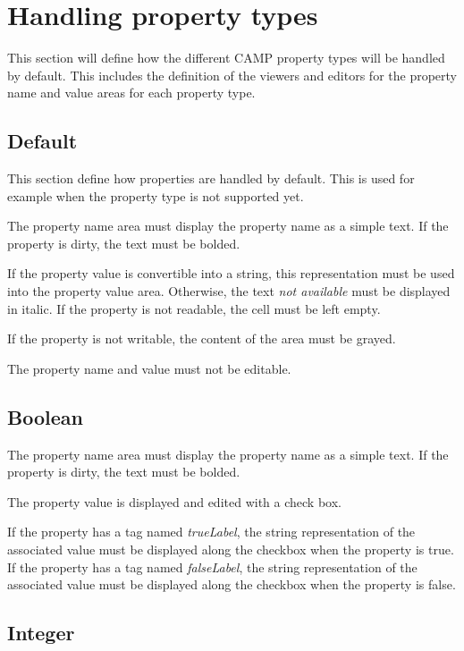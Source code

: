 \documentclass[a4paper, twoside]{report}
\begin{document}
\chapter{Handling property types\label{sec:property_types}}

This section will define how the different CAMP property types will be handled by default. This
includes the definition of the viewers and editors for the property name and value areas for each
property type.

\section{Default}

This section define how properties are handled by default. This is used for example when the
property type is not supported yet.

The property name area must display the property name as a simple text. If the property is dirty, the
text must be bolded.

If the property value is convertible into a string, this representation must be used into the
property value area. Otherwise, the text \emph{not available} must be displayed in italic. If the
property is not readable, the cell must be left empty.

If the property is not writable, the content of the area must be grayed.

The property name and value must not be editable.

\section{Boolean}

The property name area must display the property name as a simple text. If the property is dirty,
the text must be bolded.

The property value is displayed and edited with a check box.

If the property has a tag named \emph{trueLabel}, the string representation of the associated value
must be displayed along the checkbox when the property is true.
If the property has a tag named \emph{falseLabel}, the string representation of the associated value
must be displayed along the checkbox when the property is false.

\section{Integer}
\end{document}
